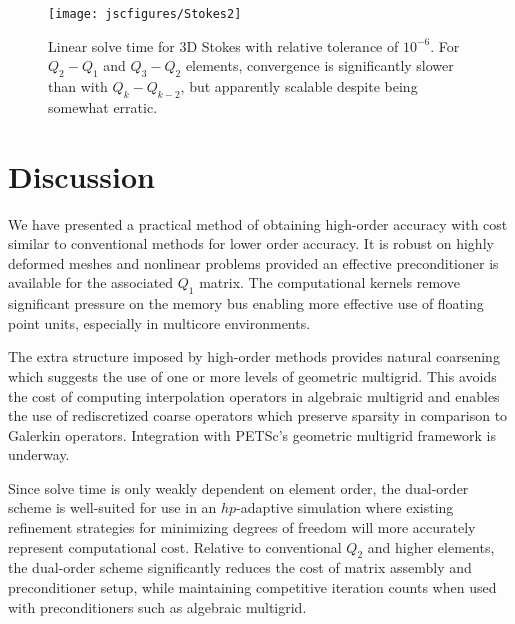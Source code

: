 \begin{figure}
  \centering\texttt{[image: jscfigures/Stokes2]}
  \caption{Linear solve time for 3D Stokes with relative tolerance of $10^{-6}$.  For $Q_2-Q_1$ and $Q_3-Q_2$ elements,
    convergence is significantly slower than with $Q_k-Q_{k-2}$, but apparently scalable despite being somewhat erratic.}
  \label{fig:stokes}
\end{figure}

\section{Discussion}
We have presented a practical method of obtaining high-order accuracy with cost similar to conventional methods for
lower order accuracy.  It is robust on highly deformed meshes and nonlinear problems provided an effective
preconditioner is available for the associated $Q_1$ matrix.  The computational kernels remove significant pressure on
the memory bus enabling more effective use of floating point units, especially in multicore environments.

The extra structure imposed by high-order methods provides natural coarsening which suggests the use of one or more
levels of geometric multigrid.  This avoids the cost of computing interpolation operators in algebraic multigrid and
enables the use of rediscretized coarse operators which preserve sparsity in comparison to Galerkin operators.
Integration with PETSc's geometric multigrid framework is underway.

Since solve time is only weakly dependent on element order, the dual-order scheme is well-suited for use in an
$hp$-adaptive simulation where existing refinement strategies for minimizing degrees of freedom will more accurately
represent computational cost.  Relative to conventional $Q_2$ and higher elements, the dual-order scheme significantly
reduces the cost of matrix assembly and preconditioner setup, while maintaining competitive iteration counts when used
with preconditioners such as algebraic multigrid.

